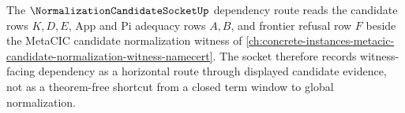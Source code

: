 The $\NormalizationCandidateSocketUp$ dependency route reads the candidate rows $K,D,E$, App and Pi adequacy rows $A,B$, and frontier refusal row $F$ beside the MetaCIC candidate normalization witness of \autoref{ch:concrete-instances-metacic-candidate-normalization-witness-namecert}. The socket therefore records witness-facing dependency as a horizontal route through displayed candidate evidence, not as a theorem-free shortcut from a closed term window to global normalization.
